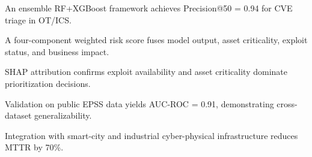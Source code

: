 \documentclass[review,12pt]{elsarticle}
\begin{document}
\begin{highlights}
\item An ensemble RF+XGBoost framework achieves Precision@50 = 0.94 for CVE triage in OT/ICS.
\item A four-component weighted risk score fuses model output, asset criticality, exploit status, and business impact.
\item SHAP attribution confirms exploit availability and asset criticality dominate prioritization decisions.
\item Validation on public EPSS data yields AUC-ROC = 0.91, demonstrating cross-dataset generalizability.
\item Integration with smart-city and industrial cyber-physical infrastructure reduces MTTR by 70\%.
\end{highlights}
\end{document}
